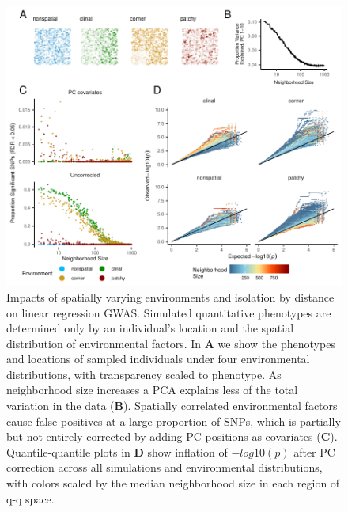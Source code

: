 \documentclass[11pt,twoside,lineno]{preprint}
\newif\ifcomments
\newcommand{\plr}[1]{\ifcomments{{\color{purple} \it (#1)}}\else{}\fi}
\begin{document}
\begin{figure}[p]
\centering
\includegraphics[width=\textwidth]{figures/gwas_summary.pdf}
\caption{Impacts of spatially varying environments and isolation by distance on linear regression GWAS. Simulated quantitative phenotypes are determined only by an individual's location and the spatial distribution of environmental factors. In \textbf{A} we show the phenotypes and locations of sampled individuals under four environmental distributions, with transparency scaled to phenotype. As neighborhood size increases a PCA explains less of the total variation in the data (\textbf{B}). Spatially correlated environmental factors cause false positives at a large proportion of SNPs, which is partially but not entirely corrected by adding PC positions as covariates (\textbf{C}). Quantile-quantile plots in \textbf{D} show inflation of $-log10(p)$ after PC correction across all simulations and environmental distributions, with colors scaled by the median neighborhood size in each region of q-q space.
    \plr{suggestion: (a) log-scale the y axes in (C) and add another y-axis on the right showing (rough number of human genome SNPs above 5\% times this percentage) so we can see absolute numbers}
}
\label{fig:gwas}
\end{figure}
\end{document}
